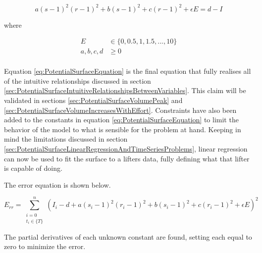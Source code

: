 \begin{equation}
    \label{eq:PotentialSurfaceEquation}
    a(s-1)^2(r-1)^2+b(s-1)^2+c(r-1)^2+\epsilon E=d-I
\end{equation}
\centerline{where}
\begin{equation*}
    \begin{split}
        E & \in \{ 0,0.5,1,1.5,...,10 \} \\
        a,b,c,d & \ge 0 \\
    \end{split}
\end{equation*}

Equation \ref{eq:PotentialSurfaceEquation} is the final equation that fully realises all of the intuitive relationships discussed in section \ref{sec:PotentialSurfaceIntuitiveRelationshipsBetweenVariables}. This claim will be validated in sections \ref{sec:PotentialSurfaceVolumePeak} and \ref{sec:PotentialSurfaceVolumeIncreasesWithEffort}. Constraints have also been added to the constants in equation \ref{eq:PotentialSurfaceEquation} to limit the behavior of the model to what is sensible for the problem at hand. Keeping in mind the limitations discussed in section \ref{sec:PotentialSurfaceLinearRegressionAndTimeSeriesProblems}, linear regression can now be used to fit the surface to a lifters data, fully defining what that lifter is capable of doing.

The error equation is shown below.

\begin{equation*}
    E_{rr}=\sum_{
            \substack{i=0\\ t_i\in \{ T \}}
        }^n \left(
        I_i
        -d
        +a(s_i-1)^2(r_i-1)^2
        +b(s_i-1)^2
        +c(r_i-1)^2
        +\epsilon E
    \right)^2
\end{equation*}

The partial derivatives of each unknown constant are found, setting each equal to zero to minimize the error.

